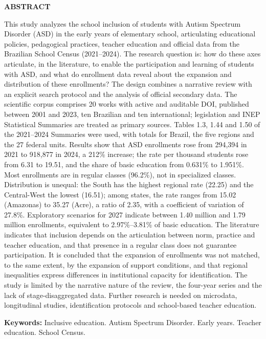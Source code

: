 \clearpage

\begin{center}
\textbf{ABSTRACT}
\end{center}

\begingroup
{}
\noindent
This study analyzes the school inclusion of students with Autism Spectrum Disorder (ASD) in the early years of elementary school, articulating educational policies, pedagogical practices, teacher education and official data from the Brazilian School Census (2021--2024). The research question is: how do these axes articulate, in the literature, to enable the participation and learning of students with ASD, and what do enrollment data reveal about the expansion and distribution of these enrollments? The design combines a narrative review with an explicit search protocol and the analysis of official secondary data. The scientific corpus comprises 20 works with active and auditable DOI, published between 2001 and 2023, ten Brazilian and ten international; legislation and INEP Statistical Summaries are treated as primary sources. Tables 1.3, 1.44 and 1.50 of the 2021--2024 Summaries were used, with totals for Brazil, the five regions and the 27 federal units. Results show that ASD enrollments rose from 294,394 in 2021 to 918,877 in 2024, a 212\% increase; the rate per thousand students rose from 6.31 to 19.51, and the share of basic education from 0.631\% to 1.951\%. Most enrollments are in regular classes (96.2\%), not in specialized classes. Distribution is unequal: the South has the highest regional rate (22.25) and the Central-West the lowest (16.51); among states, the rate ranges from 15.02 (Amazonas) to 35.27 (Acre), a ratio of 2.35, with a coefficient of variation of 27.8\%. Exploratory scenarios for 2027 indicate between 1.40 million and 1.79 million enrollments, equivalent to 2.97\%--3.81\% of basic education. The literature indicates that inclusion depends on the articulation between norm, practice and teacher education, and that presence in a regular class does not guarantee participation. It is concluded that the expansion of enrollments was not matched, to the same extent, by the expansion of support conditions, and that regional inequalities express differences in institutional capacity for identification. The study is limited by the narrative nature of the review, the four-year series and the lack of stage-disaggregated data. Further research is needed on microdata, longitudinal studies, identification protocols and school-based teacher education.

\vspace{1em}
\noindent\textbf{Keywords:} Inclusive education. Autism Spectrum Disorder. Early years. Teacher education. School Census.
\endgroup

